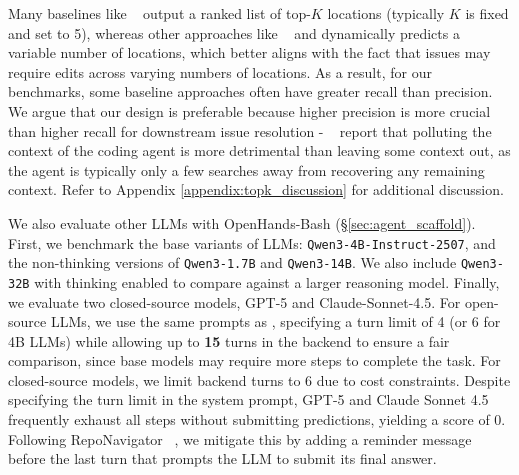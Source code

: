 Many baselines like ~\citet{ma2025toolintegratedreinforcementlearningrepo,jiang2025issuelocalizationllmdriveniterative,chen-etal-2025-locagent,xia2024agentless} output a ranked list of top-$K$ locations (typically $K$ is fixed and set to 5), whereas other approaches like ~\citet{zhang2025one, yu2025orcalocallmagentframework} and \methodname dynamically predicts a variable number of locations, which better aligns with the fact that issues may require edits across varying numbers of locations. As a result, for our benchmarks, some baseline approaches often have greater recall than precision. We argue that our design is preferable because higher precision is more crucial than higher recall for downstream issue resolution - ~\citet{cognition2025swegrep} report that polluting the context of the coding agent is more detrimental than leaving some context out, as the agent is typically only a few searches away from recovering any remaining context. Refer to Appendix \ref{appendix:topk_discussion} for additional discussion.

We also evaluate other LLMs with OpenHands-Bash (\S\ref{sec:agent_scaffold}). First, we benchmark the base variants of \methodname LLMs: \texttt{Qwen3-4B-Instruct-2507}, and the non-thinking versions of \texttt{Qwen3-1.7B} and \texttt{Qwen3-14B}. We also include \texttt{Qwen3-32B} with thinking enabled to compare against a larger reasoning model. Finally, we evaluate two closed-source models, GPT-5 and Claude-Sonnet-4.5. For open-source LLMs, we use the same prompts as \methodname, specifying a turn limit of 4 (or 6 for 4B LLMs) while allowing up to \textbf{15} turns in the backend to ensure a fair comparison, since base models may require more steps to complete the task. For closed-source models, we limit backend turns to 6 due to cost constraints. Despite specifying the turn limit in the system prompt, GPT-5 and Claude Sonnet 4.5 frequently exhaust all steps without submitting predictions, yielding a score of 0. Following RepoNavigator~\citep{zhang2025one}
, we mitigate this by adding a reminder message before the last turn that prompts the LLM to submit its final answer.
